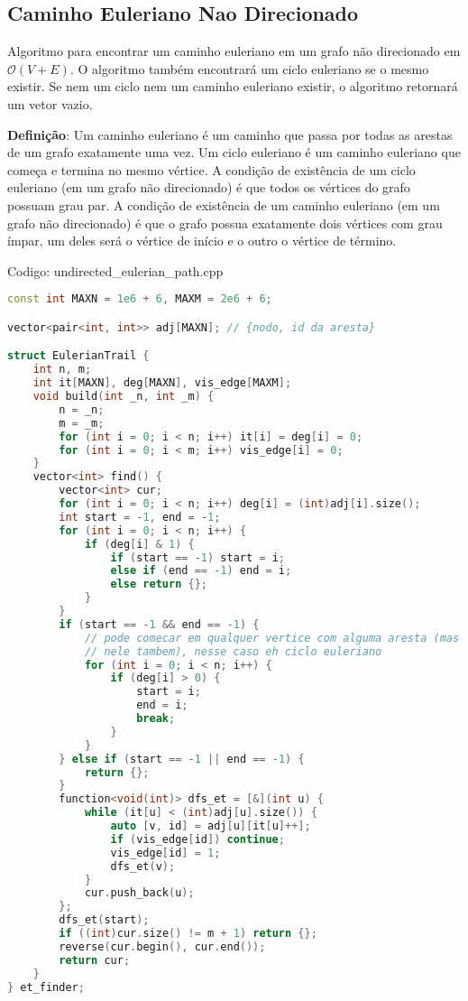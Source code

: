 \documentclass[10pt, a4paper, oneside]{book}
\begin{document}
\subsection{Caminho Euleriano Nao Direcionado}


Algoritmo para encontrar um caminho euleriano em um grafo não direcionado em $\mathcal{O}(V + E)$. O algoritmo também encontrará um ciclo euleriano se o mesmo existir. Se nem um ciclo nem um caminho euleriano existir, o algoritmo retornará um vetor vazio.



\textbf{Definição}: Um caminho euleriano é um caminho que passa por todas as arestas de um grafo exatamente uma vez. Um ciclo euleriano é um caminho euleriano que começa e termina no mesmo vértice. A condição de existência de um ciclo euleriano (em um grafo não direcionado) é que todos os vértices do grafo possuam grau par. A condição de existência de um caminho euleriano (em um grafo não direcionado) é que o grafo possua exatamente dois vértices com grau ímpar, um deles será o vértice de início e o outro o vértice de término.

\hfill

Codigo: undirected\_eulerian\_path.cpp

\begin{lstlisting}[language=C++]
const int MAXN = 1e6 + 6, MAXM = 2e6 + 6;

vector<pair<int, int>> adj[MAXN]; // {nodo, id da aresta}

struct EulerianTrail {
    int n, m;
    int it[MAXN], deg[MAXN], vis_edge[MAXM];
    void build(int _n, int _m) {
        n = _n;
        m = _m;
        for (int i = 0; i < n; i++) it[i] = deg[i] = 0;
        for (int i = 0; i < m; i++) vis_edge[i] = 0;
    }
    vector<int> find() {
        vector<int> cur;
        for (int i = 0; i < n; i++) deg[i] = (int)adj[i].size();
        int start = -1, end = -1;
        for (int i = 0; i < n; i++) {
            if (deg[i] & 1) {
                if (start == -1) start = i;
                else if (end == -1) end = i;
                else return {};
            }
        }
        if (start == -1 && end == -1) {
            // pode comecar em qualquer vertice com alguma aresta (mas tem que terminar
            // nele tambem), nesse caso eh ciclo euleriano
            for (int i = 0; i < n; i++) {
                if (deg[i] > 0) {
                    start = i;
                    end = i;
                    break;
                }
            }
        } else if (start == -1 || end == -1) {
            return {};
        }
        function<void(int)> dfs_et = [&](int u) {
            while (it[u] < (int)adj[u].size()) {
                auto [v, id] = adj[u][it[u]++];
                if (vis_edge[id]) continue;
                vis_edge[id] = 1;
                dfs_et(v);
            }
            cur.push_back(u);
        };
        dfs_et(start);
        if ((int)cur.size() != m + 1) return {};
        reverse(cur.begin(), cur.end());
        return cur;
    }
} et_finder;
\end{lstlisting}
\hfill
\end{document}
